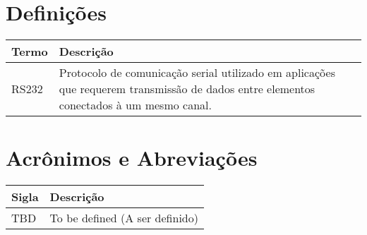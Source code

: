   \section{Definições}
    \FloatBarrier
    \begin{table}[H]
      \begin{center}
        \begin{tabular}[pos]{|m{5cm} | m{9cm}|} 
          \hline
          \cellcolor[gray]{0.9}\textbf{Termo} & \cellcolor[gray]{0.9}\textbf{Descrição} \\ \hline
          RS232                & Protocolo de comunicação serial utilizado em aplicações que requerem transmissão de dados entre elementos conectados à um mesmo canal.                    \\ \hline
        \end{tabular}
      \end{center}
    \end{table}  

  \section{Acrônimos e Abreviações}
    \FloatBarrier
    \begin{table}[H]
      \begin{center}
        \begin{tabular}[pos]{|m{2cm} | m{12cm}|} 
          \hline
          \cellcolor[gray]{0.9}\textbf{Sigla} & \cellcolor[gray]{0.9}\textbf{Descrição} \\ \hline
          TBD      &  To be defined (A ser definido)  \\ \hline
        \end{tabular}
      \end{center}
    \end{table}  
